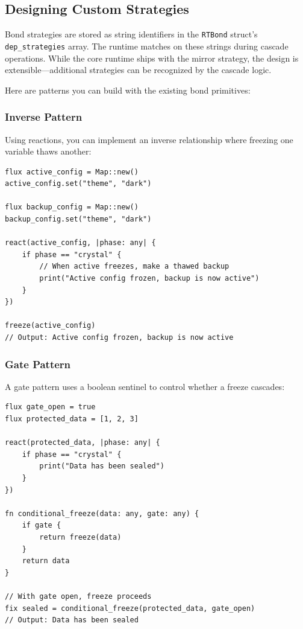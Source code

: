 \subsection{Designing Custom Strategies}

Bond strategies are stored as string identifiers in the \lstinline|RTBond| struct's \lstinline|dep_strategies| array.
The runtime matches on these strings during cascade operations.
While the core runtime ships with the mirror strategy, the design is extensible---additional strategies can be recognized by the cascade logic.

Here are patterns you can build with the existing bond primitives:

\subsubsection{Inverse Pattern}

Using reactions, you can implement an inverse relationship where freezing one variable thaws another:

\begin{lstlisting}[language=Lattice, caption={Inverse relationship via reactions}]
flux active_config = Map::new()
active_config.set("theme", "dark")

flux backup_config = Map::new()
backup_config.set("theme", "dark")

react(active_config, |phase: any| {
    if phase == "crystal" {
        // When active freezes, make a thawed backup
        print("Active config frozen, backup is now active")
    }
})

freeze(active_config)
// Output: Active config frozen, backup is now active
\end{lstlisting}

\subsubsection{Gate Pattern}

A gate pattern uses a boolean sentinel to control whether a freeze cascades:

\begin{lstlisting}[language=Lattice, caption={Gate pattern with reactions}]
flux gate_open = true
flux protected_data = [1, 2, 3]

react(protected_data, |phase: any| {
    if phase == "crystal" {
        print("Data has been sealed")
    }
})

fn conditional_freeze(data: any, gate: any) {
    if gate {
        return freeze(data)
    }
    return data
}

// With gate open, freeze proceeds
fix sealed = conditional_freeze(protected_data, gate_open)
// Output: Data has been sealed
\end{lstlisting}

